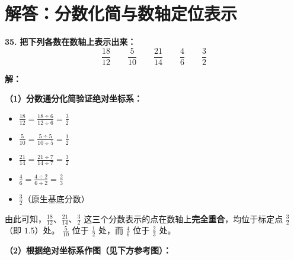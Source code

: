 \documentclass[12pt, a4paper]{ctexrep}
\begin{document}
\newpage

\section{解答：分数化简与数轴定位表示}

\vspace{0.6cm}

\textbf{\LARGE 35.} \textbf{把下列各数在数轴上表示出来：}
\[
\frac{18}{12} \qquad \frac{5}{10} \qquad \frac{21}{14} \qquad \frac{4}{6} \qquad \frac{3}{2}
\]

\vspace{0.4cm}
\textbf{解：}

\textbf{（1）分数通分化简验证绝对坐标系：}
\begin{itemize}
    \item $\displaystyle \frac{18}{12} = \frac{18 \div 6}{12 \div 6} = \frac{3}{2}$
    \item $\displaystyle \frac{5}{10} = \frac{5 \div 5}{10 \div 5} = \frac{1}{2}$
    \item $\displaystyle \frac{21}{14} = \frac{21 \div 7}{14 \div 7} = \frac{3}{2}$
    \item $\displaystyle \frac{4}{6} = \frac{4 \div 2}{6 \div 2} = \frac{2}{3}$
    \item $\displaystyle \frac{3}{2}$（原生基底分数）
\end{itemize}
由此可知，$\displaystyle\frac{18}{12}、\frac{21}{14}、\frac{3}{2}$ 这三个分数表示的点在数轴上\textbf{完全重合}，均位于标定点 $\displaystyle\frac{3}{2}$（即 $1.5$）处。
$\displaystyle\frac{5}{10}$ 位于 $\displaystyle\frac{1}{2}$ 处，而 $\displaystyle\frac{4}{6}$ 位于 $\displaystyle\frac{2}{3}$ 处。

\vspace{0.4cm}
\textbf{（2）根据绝对坐标系作图（见下方参考图）：}
\end{document}
